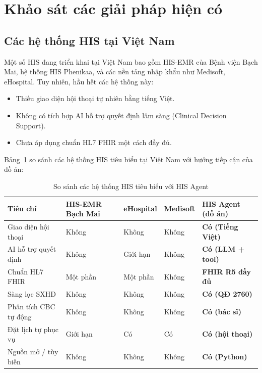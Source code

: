 \documentclass[oneside, a4paper]{book}
\theoremstyle{plain}
\theoremstyle{plain}
\theoremstyle{definition}
\theoremstyle{remark}
\begin{document}
\section{Khảo sát các giải pháp hiện có}

\subsection{Các hệ thống HIS tại Việt Nam}

Một số HIS đang triển khai tại Việt Nam bao gồm HIS-EMR của Bệnh viện Bạch Mai, hệ thống HIS Phenikaa, và các nền tảng nhập khẩu như Medisoft, eHospital. Tuy nhiên, hầu hết các hệ thống này:
\begin{itemize}
  \item Thiếu giao diện hội thoại tự nhiên bằng tiếng Việt.
  \item Không có tích hợp AI hỗ trợ quyết định lâm sàng (Clinical Decision Support).
  \item Chưa áp dụng chuẩn HL7 FHIR một cách đầy đủ.
\end{itemize}

Bảng~\ref{tab:his-compare} so sánh các hệ thống HIS tiêu biểu tại Việt Nam với hướng tiếp cận của đồ án:

\begin{table}[H]
\centering
\begin{tabular}{|p{3.2cm}|p{2.2cm}|p{2.2cm}|p{2.2cm}|p{2.2cm}|}
\hline
\textbf{Tiêu chí} & \textbf{HIS-EMR Bạch Mai} & \textbf{eHospital} & \textbf{Medisoft} & \textbf{HIS Agent (đồ án)} \\
\hline
Giao diện hội thoại & Không & Không & Không & \textbf{Có (Tiếng Việt)} \\
AI hỗ trợ quyết định & Không & Giới hạn & Không & \textbf{Có (LLM + tool)} \\
Chuẩn HL7 FHIR & Một phần & Một phần & Không & \textbf{FHIR R5 đầy đủ} \\
Sàng lọc SXHD & Không & Không & Không & \textbf{Có (QĐ 2760)} \\
Phân tích CBC tự động & Không & Không & Không & \textbf{Có (bác sĩ)} \\
Đặt lịch tự phục vụ & Giới hạn & Có & Có & \textbf{Có (hội thoại)} \\
Nguồn mở / tùy biến & Không & Không & Không & \textbf{Có (Python)} \\
\hline
\end{tabular}
\caption{So sánh các hệ thống HIS tiêu biểu với HIS Agent}
\label{tab:his-compare}
\end{table}
\end{document}
